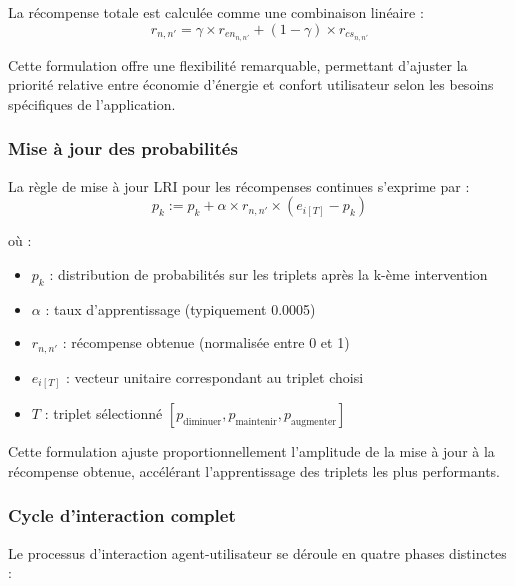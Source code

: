 \documentclass[a4paper,11pt]{article}
\begin{document}
La récompense totale est calculée comme une combinaison linéaire \cite{recompense} :
$$r_{n,n'} = \gamma \times r_{en_{n,n'}} + (1 - \gamma) \times r_{cs_{n,n'}}$$

Cette formulation offre une flexibilité remarquable, permettant d'ajuster la priorité relative entre économie d'énergie et confort utilisateur selon les besoins spécifiques de l'application.

\subsubsection{Mise à jour des probabilités}

La règle de mise à jour LRI pour les récompenses continues s'exprime par :
$$p_k := p_k + \alpha \times r_{n,n'} \times (e_{i[T]} - p_k)$$

où :
\begin{itemize}
    \item $p_k$ : distribution de probabilités sur les triplets après la k-ème intervention
    \item $\alpha$ : taux d'apprentissage (typiquement 0.0005)
    \item $r_{n,n'}$ : récompense obtenue (normalisée entre 0 et 1)
    \item $e_{i[T]}$ : vecteur unitaire correspondant au triplet choisi
    \item $T$ : triplet sélectionné $[p_{\text{diminuer}}, p_{\text{maintenir}}, p_{\text{augmenter}}]$
\end{itemize}

Cette formulation ajuste proportionnellement l'amplitude de la mise à jour à la récompense obtenue, accélérant l'apprentissage des triplets les plus performants.

\subsubsection{Cycle d'interaction complet}

Le processus d'interaction agent-utilisateur se déroule en quatre phases distinctes :
\end{document}
